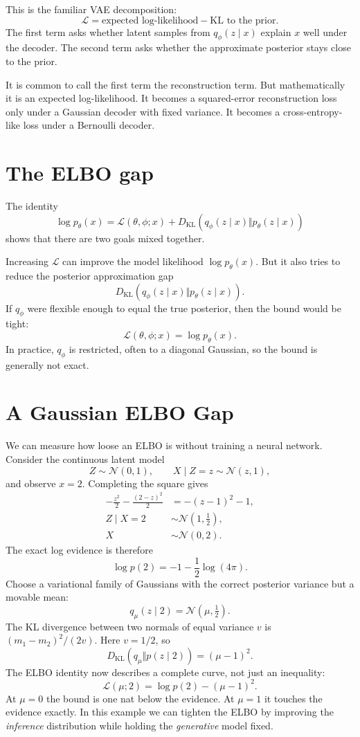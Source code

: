 This is the familiar VAE decomposition:
\[
  \boxed{
  \mathcal L
  =\text{expected log-likelihood}
  -\text{KL to the prior}.}
\]
The first term asks whether latent samples from \(q_\phi(z\mid x)\) explain \(x\) well under the decoder.  The second term asks whether the approximate posterior stays close to the prior.

It is common to call the first term the reconstruction term.  But mathematically it is an expected log-likelihood.  It becomes a squared-error reconstruction loss only under a Gaussian decoder with fixed variance.  It becomes a cross-entropy-like loss under a Bernoulli decoder.

\section{The ELBO gap}

The identity
\[
  \log p_\theta(x)
  =\mathcal L(\theta,\phi;x)
  +D_{\mathrm{KL}}(q_\phi(z\mid x)\Vert p_\theta(z\mid x))
\]
shows that there are two goals mixed together.

Increasing \(\mathcal L\) can improve the model likelihood \(\log p_\theta(x)\).  But it also tries to reduce the posterior approximation gap
\[
  D_{\mathrm{KL}}(q_\phi(z\mid x)\Vert p_\theta(z\mid x)).
\]
If \(q_\phi\) were flexible enough to equal the true posterior, then the bound would be tight:
\[
  \mathcal L(\theta,\phi;x)=\log p_\theta(x).
\]
In practice, \(q_\phi\) is restricted, often to a diagonal Gaussian, so the bound is generally not exact.

\section{A Gaussian ELBO Gap}

We can measure how loose an ELBO is without training a neural network. Consider the continuous latent model
\[
 Z\sim\mathcal N(0,1),\qquad
 X\mid Z=z\sim\mathcal N(z,1),
\]
and observe $x=2$. Completing the square gives
\[
 \begin{aligned}
 -\frac{z^2}{2}-\frac{(2-z)^2}{2}
 &=-(z-1)^2-1,\\
 Z\mid X=2&\sim\mathcal N(1,\tfrac12),\\
 X&\sim\mathcal N(0,2).
 \end{aligned}
\]
The exact log evidence is therefore
\[
 \log p(2)=-1-\frac12\log(4\pi).
\]
Choose a variational family of Gaussians with the correct posterior variance but a movable mean:
\[
 q_\mu(z\mid2)=\mathcal N(\mu,\tfrac12).
\]
The KL divergence between two normals of equal variance $v$ is
$(m_1-m_2)^2/(2v)$. Here $v=1/2$, so
\[
 \boxed{D_{\mathrm{KL}}(q_\mu\Vert p(z\mid2))=(\mu-1)^2.}
\]
The ELBO identity now describes a complete curve, not just an inequality:
\[
 \boxed{\mathcal L(\mu;2)=\log p(2)-(\mu-1)^2.}
\]
At $\mu=0$ the bound is one nat below the evidence. At $\mu=1$ it touches the evidence exactly. In this example we can tighten the ELBO by improving the \emph{inference} distribution while holding the \emph{generative} model fixed.

